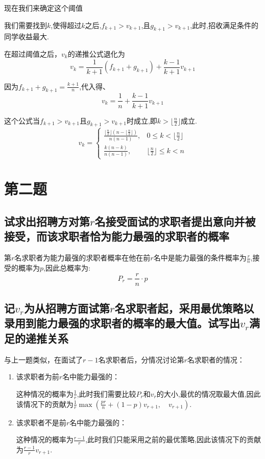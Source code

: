 \documentclass{ctexart}
\begin{document}
现在我们来确定这个阈值

我们需要找到$k$,使得超过$k$之后,$f_{k + 1} > v_{k + 1}$,且$g_{k + 1} > v_{k + 1}$,此时,招收满足条件的同学收益最大.

在超过阈值之后，$v_k$的递推公式退化为
\begin{equation}
    v_k = \frac{1}{k + 1}(f_{k + 1} + g_{k + 1}) + \frac{k - 1}{k + 1}v_{k + 1}
\end{equation}

因为$f_{k + 1} + g_{k + 1} = \frac{k + 1}{n}$,代入得、
\begin{equation}
    v_k = \frac{1}{n} + \frac{k - 1}{k + 1}v_{k + 1}
\end{equation}

这个公式当$f_{k + 1} > v_{k + 1}$且$g_{k + 1} > v_{k + 1}$时成立,即$k > \lfloor \frac{n}{2} \rfloor$成立.
\begin{equation}
    v_k = \begin{cases}
        \frac{\lfloor \frac{n}{2} \rfloor (n - \lfloor \frac{n}{2} \rfloor)}{n(n-1)}, & 0 \le k < \lfloor \frac{n}{2} \rfloor \\
        \frac{k(n-k)}{n(n-1)},                                                        & \lfloor \frac{n}{2} \rfloor \le k < n
    \end{cases}
\end{equation}
\section{第二题}
\subsection{试求出招聘方对第$r$名接受面试的求职者提出意向并被接受，而该求职者恰为能力最强的求职者的概率}
第$r$名求职者为能力最强的求职者概率在他在前$r$名中是能力最强的条件概率为$\frac{r}{n}$,接受的概率为$p$,因此总概率为:
\begin{equation}
    P_r = \frac{r}{n}\cdot p
\end{equation}
\subsection{记$v_r$为从招聘方面试第$r$名求职者起，采用最优策略以录用到能力最强的求职者的概率的最大值。试写出$v_r$满足的递推关系}
与上一题类似，在面试了$r - 1$名求职者后，分情况讨论第$r$名求职者的情况：
\begin{enumerate}
    \item 该求职者为前$r$名中能力最强的：

          这种情况的概率为$\frac{1}{r}$,此时我们需要比较$P_{r}$和$v_{r}$的大小,最优的情况取最大值,因此该情况下的贡献为$\frac{1}{r}\max(\frac{pr}{n} + (1 - p)v_{r + 1}, \quad v_{r + 1})$.
    \item 该求职者不是前$r$名中能力最强的：

          这种情况的概率为$\frac{r - 1}{r}$,此时我们只能采用之前的最优策略,因此该情况下的贡献为$\frac{r - 1}{r}v_{r + 1}$.
\end{enumerate}
\end{document}
